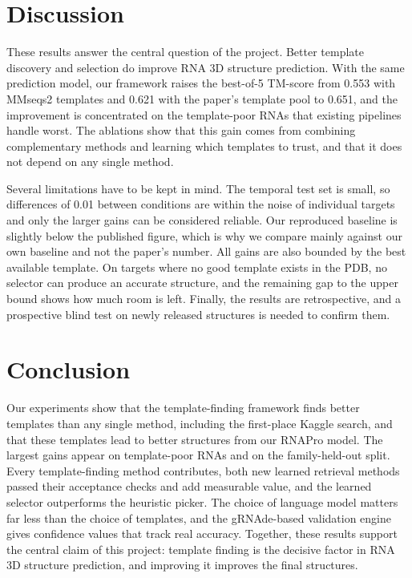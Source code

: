 \documentclass{FastFyp}
\begin{document}
\section{Discussion}
These results answer the central question of the project. Better template discovery and selection do improve RNA 3D structure prediction. With the same prediction model, our framework raises the best-of-5 TM-score from 0.553 with MMseqs2 templates and 0.621 with the paper's template pool to 0.651, and the improvement is concentrated on the template-poor RNAs that existing pipelines handle worst. The ablations show that this gain comes from combining complementary methods and learning which templates to trust, and that it does not depend on any single method.

Several limitations have to be kept in mind. The temporal test set is small, so differences of 0.01 between conditions are within the noise of individual targets and only the larger gains can be considered reliable. Our reproduced baseline is slightly below the published figure, which is why we compare mainly against our own baseline and not the paper's number. All gains are also bounded by the best available template. On targets where no good template exists in the PDB, no selector can produce an accurate structure, and the remaining gap to the upper bound shows how much room is left. Finally, the results are retrospective, and a prospective blind test on newly released structures is needed to confirm them.

\section{Conclusion}
Our experiments show that the template-finding framework finds better templates than any single method, including the first-place Kaggle search, and that these templates lead to better structures from our RNAPro model. The largest gains appear on template-poor RNAs and on the family-held-out split. Every template-finding method contributes, both new learned retrieval methods passed their acceptance checks and add measurable value, and the learned selector outperforms the heuristic picker. The choice of language model matters far less than the choice of templates, and the gRNAde-based validation engine gives confidence values that track real accuracy. Together, these results support the central claim of this project: template finding is the decisive factor in RNA 3D structure prediction, and improving it improves the final structures.
\end{document}

